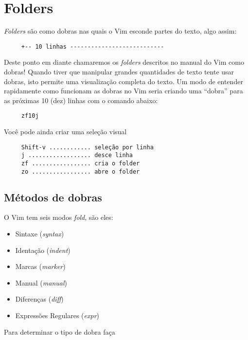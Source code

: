 
\chapter{Folders}
\label{cha:Folders}
{\em Folders} são como dobras nas quais o Vim esconde partes do texto,
algo assim:

\begin{verbatim}
     +-- 10 linhas ---------------------------
\end{verbatim}

Deste ponto em diante chamaremos os {\em folders} descritos no manual do
Vim como dobras!  Quando tiver que manipular grandes quantidades de
texto tente usar dobras, isto permite uma visualização completa do
texto.  Um modo de entender rapidamente como funcionam as dobras no
Vim seria criando uma ``dobra'' para as próximas 10 (dez) linhas com o
comando abaixo:

\begin{verbatim}
     zf10j
\end{verbatim}

Você pode ainda criar uma seleção visual

\begin{verbatim}
     Shift-v ............ seleção por linha
     j .................. desce linha
     zf ................. cria o folder
     zo ................. abre o folder
\end{verbatim}

\section{Métodos de dobras }
\label{Métodos de dobras }
O Vim tem seis modos {\em fold}, são eles:

\begin{itemize}
\item Sintaxe ({\em syntax})
\item Identação ({\em indent})
\item Marcas ({\em marker})
\item Manual ({\em manual})
\item Diferenças ({\em diff})
\item Expressões Regulares ({\em expr})
\end{itemize}

Para determinar o tipo de dobra faça

